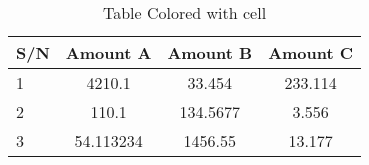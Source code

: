 \documentclass{article}
\begin{document}
	\begin{table}[h!]
		\begin{center}
			\caption{Table Colored with cell}
			\label{tab:table1}
			\begin{tabular}{l|S|S|c}
				\hline
				\textbf{S/N} & \textbf{Amount A} & \textbf{Amount B} & \textbf{Amount C}\\
				\hline
				1 & 4210.1 & 33.454 &233.114\\
				2 & 110.1 & 134.5677 & 3.556\\
				3 & 54.113234 & 1456.55 & 13.177\\
				\hline
			\end{tabular}
		\end{center}
	\end{table}
\end{document}
